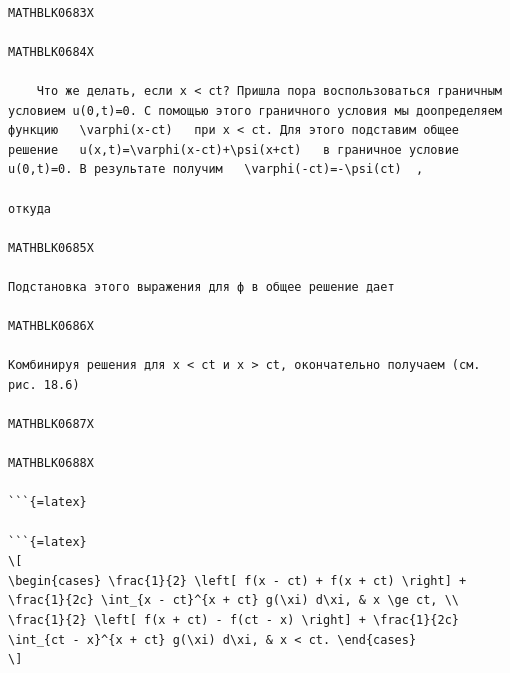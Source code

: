 \documentclass[
]{article}
\begin{document}
\begin{verbatim}

MATHBLK0683X

MATHBLK0684X

    Что же делать, если x < ct? Пришла пора воспользоваться граничным условием u(0,t)=0. С помощью этого граничного условия мы доопределяем функцию   \varphi(x-ct)   при x < ct. Для этого подставим общее решение   u(x,t)=\varphi(x-ct)+\psi(x+ct)   в граничное условие u(0,t)=0. В результате получим   \varphi(-ct)=-\psi(ct)  ,

откуда

MATHBLK0685X

Подстановка этого выражения для ф в общее решение дает

MATHBLK0686X

Комбинируя решения для x < ct и x > ct, окончательно получаем (см. рис. 18.6)

MATHBLK0687X

MATHBLK0688X

```{=latex}

```{=latex}
\[
\begin{cases} \frac{1}{2} \left[ f(x - ct) + f(x + ct) \right] + \frac{1}{2c} \int_{x - ct}^{x + ct} g(\xi) d\xi, & x \ge ct, \\ \frac{1}{2} \left[ f(x + ct) - f(ct - x) \right] + \frac{1}{2c} \int_{ct - x}^{x + ct} g(\xi) d\xi, & x < ct. \end{cases}
\]
\end{verbatim}
\end{document}
